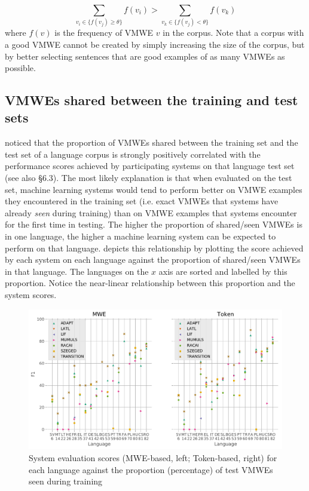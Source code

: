 \documentclass[output=paper
,modfonts
,nonflat,draftmode]{langsci/langscibook}
\begin{document}
\[
\sum_{v_{i}\in\{f(v_{j})\geq\theta\}}f(v_{i})>\sum_{v_{k}\in\{f(v_{j})<\theta\}}f(v_{k})
\]
where $f(v)$ is the frequency of VMWE $v$ in the corpus. Note that a corpus with a good VMWE  cannot be created by simply increasing the size of the corpus, but by better selecting sentences that are good examples of as many VMWEs as possible. 

\subsection{\label{sec:shared}VMWEs shared between the training and test sets}

\citet{maldonado2017} noticed that the proportion of VMWEs shared between the training set and the test set of a language corpus is strongly positively correlated with the performance scores achieved by participating systems on that language test set (see also  §6.3). The most likely explanation is that when evaluated on the test set, machine learning systems would tend to perform better on VMWE examples they encountered in the training set (i.e. exact VMWEs that systems have already \emph{seen} during training) than on VMWE examples that systems encounter for the first time in testing. The higher the proportion of shared/seen VMWEs is in one language, the higher a machine learning system can be expected to perform on that language.  depicts this relationship by plotting the score achieved by each system on each language against the proportion of shared/seen VMWEs in that language. The languages on the $x$ axis are sorted and labelled by this proportion. Notice the near-linear relationship between this proportion and the system scores.

\begin{figure}
\includegraphics[scale=0.45]{figures/sys-f1-vs-ps-allvmwes.pdf}
\caption{\label{fig:f1-vs-ps-all}System evaluation scores (MWE-based, left; Token-based, right) for each language against the proportion (percentage) of test VMWEs seen during training}
\end{figure}
\end{document}
